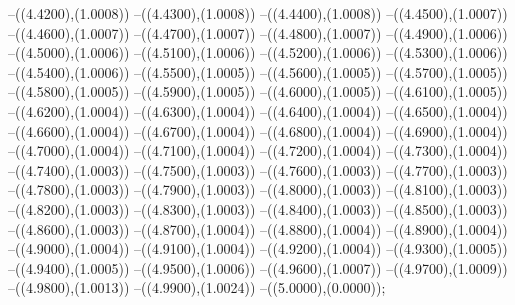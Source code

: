 {	--({\sx*(4.4200)},{\sy*(1.0008)})
	--({\sx*(4.4300)},{\sy*(1.0008)})
	--({\sx*(4.4400)},{\sy*(1.0008)})
	--({\sx*(4.4500)},{\sy*(1.0007)})
	--({\sx*(4.4600)},{\sy*(1.0007)})
	--({\sx*(4.4700)},{\sy*(1.0007)})
	--({\sx*(4.4800)},{\sy*(1.0007)})
	--({\sx*(4.4900)},{\sy*(1.0006)})
	--({\sx*(4.5000)},{\sy*(1.0006)})
	--({\sx*(4.5100)},{\sy*(1.0006)})
	--({\sx*(4.5200)},{\sy*(1.0006)})
	--({\sx*(4.5300)},{\sy*(1.0006)})
	--({\sx*(4.5400)},{\sy*(1.0006)})
	--({\sx*(4.5500)},{\sy*(1.0005)})
	--({\sx*(4.5600)},{\sy*(1.0005)})
	--({\sx*(4.5700)},{\sy*(1.0005)})
	--({\sx*(4.5800)},{\sy*(1.0005)})
	--({\sx*(4.5900)},{\sy*(1.0005)})
	--({\sx*(4.6000)},{\sy*(1.0005)})
	--({\sx*(4.6100)},{\sy*(1.0005)})
	--({\sx*(4.6200)},{\sy*(1.0004)})
	--({\sx*(4.6300)},{\sy*(1.0004)})
	--({\sx*(4.6400)},{\sy*(1.0004)})
	--({\sx*(4.6500)},{\sy*(1.0004)})
	--({\sx*(4.6600)},{\sy*(1.0004)})
	--({\sx*(4.6700)},{\sy*(1.0004)})
	--({\sx*(4.6800)},{\sy*(1.0004)})
	--({\sx*(4.6900)},{\sy*(1.0004)})
	--({\sx*(4.7000)},{\sy*(1.0004)})
	--({\sx*(4.7100)},{\sy*(1.0004)})
	--({\sx*(4.7200)},{\sy*(1.0004)})
	--({\sx*(4.7300)},{\sy*(1.0004)})
	--({\sx*(4.7400)},{\sy*(1.0003)})
	--({\sx*(4.7500)},{\sy*(1.0003)})
	--({\sx*(4.7600)},{\sy*(1.0003)})
	--({\sx*(4.7700)},{\sy*(1.0003)})
	--({\sx*(4.7800)},{\sy*(1.0003)})
	--({\sx*(4.7900)},{\sy*(1.0003)})
	--({\sx*(4.8000)},{\sy*(1.0003)})
	--({\sx*(4.8100)},{\sy*(1.0003)})
	--({\sx*(4.8200)},{\sy*(1.0003)})
	--({\sx*(4.8300)},{\sy*(1.0003)})
	--({\sx*(4.8400)},{\sy*(1.0003)})
	--({\sx*(4.8500)},{\sy*(1.0003)})
	--({\sx*(4.8600)},{\sy*(1.0003)})
	--({\sx*(4.8700)},{\sy*(1.0004)})
	--({\sx*(4.8800)},{\sy*(1.0004)})
	--({\sx*(4.8900)},{\sy*(1.0004)})
	--({\sx*(4.9000)},{\sy*(1.0004)})
	--({\sx*(4.9100)},{\sy*(1.0004)})
	--({\sx*(4.9200)},{\sy*(1.0004)})
	--({\sx*(4.9300)},{\sy*(1.0005)})
	--({\sx*(4.9400)},{\sy*(1.0005)})
	--({\sx*(4.9500)},{\sy*(1.0006)})
	--({\sx*(4.9600)},{\sy*(1.0007)})
	--({\sx*(4.9700)},{\sy*(1.0009)})
	--({\sx*(4.9800)},{\sy*(1.0013)})
	--({\sx*(4.9900)},{\sy*(1.0024)})
	--({\sx*(5.0000)},{\sy*(0.0000)});
}
\def\xwerteb{
\fill[color=red] (0.0000,0) circle[radius={0.07/\skala}];
\fill[color=red] (1.2500,0) circle[radius={0.07/\skala}];
\fill[color=red] (2.5000,0) circle[radius={0.07/\skala}];
\fill[color=red] (3.7500,0) circle[radius={0.07/\skala}];
\fill[color=red] (5.0000,0) circle[radius={0.07/\skala}];
}
\def\punkteb{4}
\def\maxfehlerb{3.011\cdot 10^{-2}}
